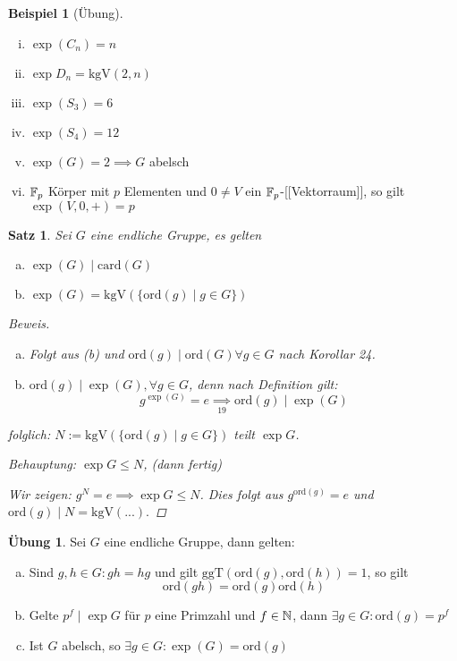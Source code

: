 \documentclass[a4paper]{report}
\theoremstyle{plain}
\newtheorem{satz}[thm]{Satz}
\theoremstyle{definition}
\newtheorem*{bsp*}{Beispiel}
\newtheorem{ubng}[thm]{Übung}
\begin{document}
\begin{bsp*}[Übung] \item
\begin{enumerate}[(i)]
\item $\exp (C_{n}) = n$
\item $\exp D_{n} = \mathrm{kgV}(2,n)$
\item $\exp(S_{3}) = 6$
\item $\exp(S_{4}) = 12$
\item $\exp(G) = 2 \implies G$ abelsch
\item $\Bbb F_{p}$ Körper mit $p$ Elementen und $0 \neq V$ ein $\Bbb F_{p}$-[[Vektorraum]], so gilt $\exp(V, 0, +) = p$
\end{enumerate}
\end{bsp*}

\begin{satz}
  Sei $G$ eine endliche Gruppe, es gelten
  \begin{enumerate}[(a)]
    \item $\exp(G) \mid \mathrm{card}(G)$
    \item $\exp(G) = \mathrm{kgV}(\{\mathrm{ord}(g)\mid g \in G\})$
  \end{enumerate}
\begin{proof}[Beweis] \item
\begin{enumerate}[(a)]
\item Folgt aus (b) und $\mathrm{ord}(g) \mid \mathrm{ord}(G) \forall g \in G$ nach Korollar 24.
\item $\mathrm{ord}(g) \mid \exp(G), \forall g \in G$, denn nach Definition gilt:
$$g^{\exp(G)} = e \underset{19} \implies \mathrm{ord}(g ) \mid \exp(G)$$
\end{enumerate}
folglich: $N:= \mathrm{kgV}(\{\mathrm{ord}(g) \mid g \in G\})$ teilt $\exp G$.

        Behauptung: $\exp G \le N$, (dann fertig)

        Wir zeigen: $g^{N} = e \implies \exp G \le N$.
Dies folgt aus $g^{\mathrm{ord}(g)} = e$ und $\mathrm{ord}(g) \mid N = \mathrm{kgV}(...).$
\end{proof}
\end{satz}

\begin{ubng}%
  Sei $G$ eine endliche Gruppe, dann gelten:
  \begin{enumerate}[(a)]
    \item Sind $g,h \in G : gh = hg$ und gilt $\mathrm{ggT}(\mathrm{ord}(g), \mathrm{ord}(h)) = 1$, so gilt $$\mathrm{ord}(gh) = \mathrm{ord}(g)\mathrm{ord}(h)$$
    \item Gelte $p^{f} \mid \exp G$ für $p$ eine Primzahl und $f \in \Bbb N$, dann $\exists g \in G : \mathrm{ord}(g) = p^{f}$
    \item Ist $G$ abelsch, so $\exists g \in G : \exp (G) = \mathrm{ord}(g)$
  \end{enumerate}
\end{ubng}
\end{document}
